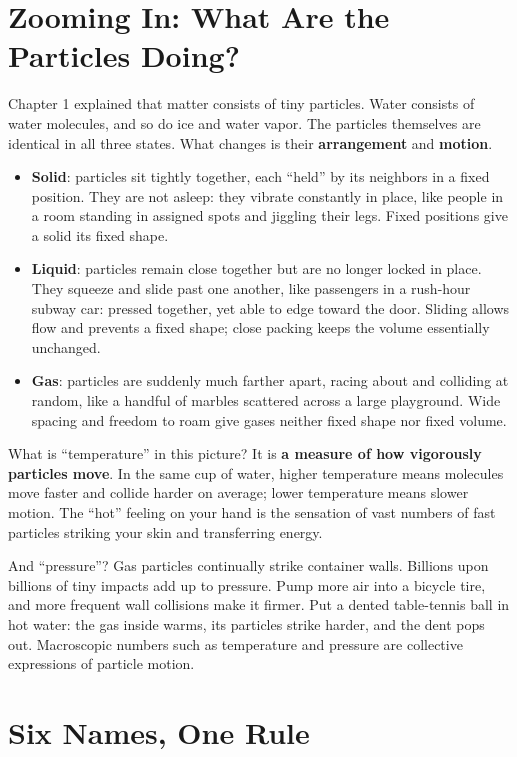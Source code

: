 \section{Zooming In: What Are the Particles Doing?}

Chapter 1 explained that matter consists of tiny particles. Water consists of water molecules, and so do ice and water vapor. The particles themselves are identical in all three states. What changes is their \textbf{arrangement} and \textbf{motion}.

\begin{itemize}[itemsep=2pt]
\item \textbf{Solid}: particles sit tightly together, each ``held'' by its neighbors in a fixed position. They are not asleep: they vibrate constantly in place, like people in a room standing in assigned spots and jiggling their legs. Fixed positions give a solid its fixed shape.
\item \textbf{Liquid}: particles remain close together but are no longer locked in place. They squeeze and slide past one another, like passengers in a rush-hour subway car: pressed together, yet able to edge toward the door. Sliding allows flow and prevents a fixed shape; close packing keeps the volume essentially unchanged.
\item \textbf{Gas}: particles are suddenly much farther apart, racing about and colliding at random, like a handful of marbles scattered across a large playground. Wide spacing and freedom to roam give gases neither fixed shape nor fixed volume.
\end{itemize}

What is ``temperature'' in this picture? It is \textbf{a measure of how vigorously particles move}. In the same cup of water, higher temperature means molecules move faster and collide harder on average; lower temperature means slower motion. The ``hot'' feeling on your hand is the sensation of vast numbers of fast particles striking your skin and transferring energy.

And ``pressure''? Gas particles continually strike container walls. Billions upon billions of tiny impacts add up to pressure. Pump more air into a bicycle tire, and more frequent wall collisions make it firmer. Put a dented table-tennis ball in hot water: the gas inside warms, its particles strike harder, and the dent pops out. Macroscopic numbers such as temperature and pressure are collective expressions of particle motion.

\section{Six Names, One Rule}

